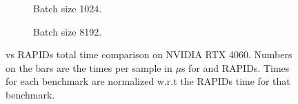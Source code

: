\begin{figure}[ht]
  \centering
  \begin{subfigure}[b]{.45\textwidth}
    \caption{Batch size 1024.}
  \end{subfigure}
  \begin{subfigure}[b]{.45\textwidth}
    \caption{Batch size 8192.}
  \end{subfigure}
  \hfill
  \caption{\Treebeard{} vs RAPIDs total time comparison on NVIDIA RTX 4060. Numbers on the bars are the times 
  per sample in $\mu$s for \Treebeard{} and RAPIDs. Times for each benchmark are normalized w.r.t the RAPIDs time for that benchmark.}
\end{figure}

